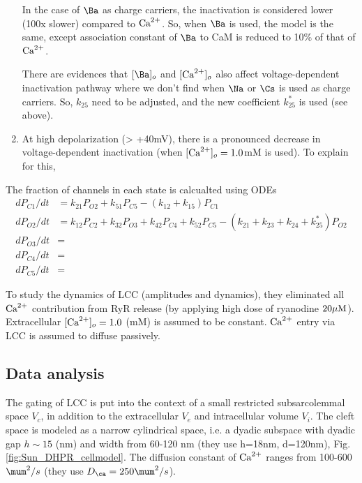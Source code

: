 \begin{enumerate}
In the case of $\Ba$ as charge carriers, the inactivation is considered lower
(100x slower) compared to ${\text{Ca}^{2+}}$. So, when $\Ba$ is used, the model is the same,
except association constant of $\Ba$ to CaM is reduced to 10\% of that of ${\text{Ca}^{2+}}$. 

There are evidences that $[\Ba]_o$ and $[{\text{Ca}^{2+}}]_o$ also affect voltage-dependent
inactivation pathway where we don't find when $\Na$ or $\Cs$ is used as charge
carriers. So, $k_{25}$ need to be adjusted, and the new coefficient $k^*_{25}$
is used (see above). 

\item At high depolarization (> +40mV), there is a pronounced decrease in
voltage-dependent inactivation (when $[{\text{Ca}^{2+}}]_o=1.0$mM is used). To explain for
this, 
\end{enumerate}


The fraction of channels in each state is calcualted using ODEs
\begin{equation}
\begin{split}
dP_{C1}/dt &= k_{21} P_{O2} + k_{51} P_{C5} - (k_{12}+k_{15}) P_{C1} \\
dP_{O2}/dt &= k_{12} P_{C2} + k_{32} P_{O3} + k_{42} P_{C4} + k_{52} P_{C5} -
(k_{21}+k_{23}+k_{24}+k_{25}^*) P_{O2} \\
dP_{O3}/dt &=  \\
dP_{C4}/dt &=  \\
dP_{C5}/dt &= 
\end{split}
\end{equation}

\begin{framed}
To study the dynamics of LCC (amplitudes and dynamics), they eliminated all
${\text{Ca}^{2+}}$ contribution from RyR release (by applying high dose of ryanodine
$20{\mu\text{M}}$). Extracellular  $[{\text{Ca}^{2+}}]_o=1.0$ (mM) is assumed to be constant. ${\text{Ca}^{2+}}$
entry via LCC is assumed to diffuse passively.
\end{framed}



\subsection{Data analysis}
\label{sec:Sun_dataanalysis}

The gating of LCC is put into the context of a small restricted
subsarcolemmal space $V_c$, in addition to the extracellular $V_e$ and
intracellular volume $V_i$. The cleft space is  modeled as a narrow cylindrical
space, i.e. a dyadic subspace  with dyadic gap $h\sim 15$ (nm) and width from
60-120 nm (they use h=18nm, d=120nm), Fig.\ref{fig:Sun_DHPR_cellmodel}. The
diffusion constant of ${\text{Ca}^{2+}}$ ranges from 100-600 $\mum^2/s$ (they use $D_\ca=250\mum^2/s$).

